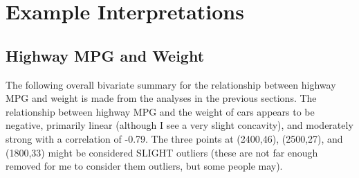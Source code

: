\documentclass[10pt,openany]{book}\usepackage[]{graphicx}\usepackage[]{color}
\begin{document}
\section{Example Interpretations}
\vspace{-12pt}
\subsection{Highway MPG and Weight}
\vspace{-6pt}
The following overall bivariate summary for the relationship between highway MPG and weight is made from the analyses in the previous sections.  The relationship between highway MPG and the weight of cars  appears to be negative, primarily linear (although I see a very slight concavity), and moderately strong with a correlation of -0.79.  The three points at (2400,46), (2500,27), and (1800,33) might be considered SLIGHT outliers (these are not far enough removed for me to consider them outliers, but some people may).
\end{document}
